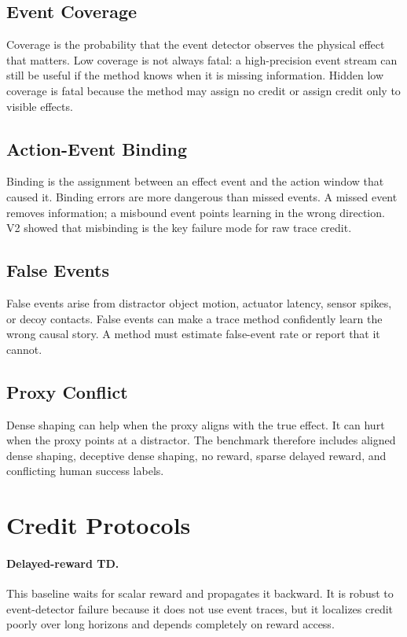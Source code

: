 \documentclass{article}
\begin{document}
\subsection{Event Coverage}

Coverage is the probability that the event detector observes the physical effect that matters. Low coverage is not always fatal: a high-precision event stream can still be useful if the method knows when it is missing information. Hidden low coverage is fatal because the method may assign no credit or assign credit only to visible effects.

\subsection{Action-Event Binding}

Binding is the assignment between an effect event and the action window that caused it. Binding errors are more dangerous than missed events. A missed event removes information; a misbound event points learning in the wrong direction. V2 showed that misbinding is the key failure mode for raw trace credit.

\subsection{False Events}

False events arise from distractor object motion, actuator latency, sensor spikes, or decoy contacts. False events can make a trace method confidently learn the wrong causal story. A method must estimate false-event rate or report that it cannot.

\subsection{Proxy Conflict}

Dense shaping can help when the proxy aligns with the true effect. It can hurt when the proxy points at a distractor. The benchmark therefore includes aligned dense shaping, deceptive dense shaping, no reward, sparse delayed reward, and conflicting human success labels.

\section{Credit Protocols}

\paragraph{Delayed-reward TD.}
This baseline waits for scalar reward and propagates it backward. It is robust to event-detector failure because it does not use event traces, but it localizes credit poorly over long horizons and depends completely on reward access.
\end{document}
